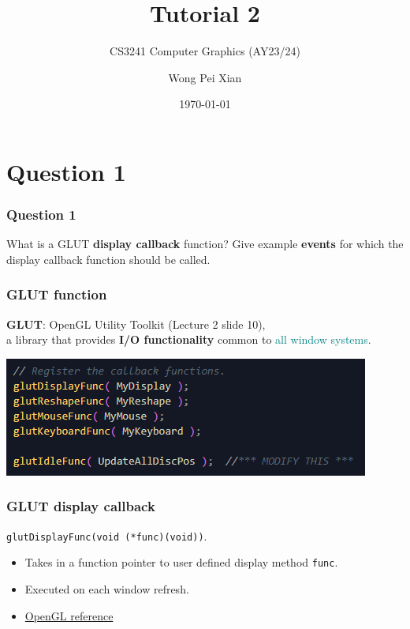 \documentclass{beamer}
\title{Tutorial 2}
\subtitle{CS3241 Computer Graphics (AY23/24)}
\date{\today}
\author{Wong Pei Xian}
\institute[]{\email{e0389023@u.nus.edu}}
\begin{document}
\frame[plain]{\titlepage}

\section{Question 1}

\begin{frame}
    \frametitle{Question 1}
    What is a GLUT \textbf{display callback} function?  
    Give example \textbf{events} for which the display callback function should be called.
\end{frame}

\begin{frame}
    \frametitle{GLUT function}

    \begin{tcolorbox}
        \textbf{GLUT}: OpenGL Utility Toolkit (Lecture 2 slide 10), \\
        
        a library that provides \textbf{I/O functionality} common to \textcolor{teal}{all window systems}.
    \end{tcolorbox}

    \begin{center}
        \includegraphics[]{q1-glut-callbacks.png}
    \end{center}

\end{frame}

\begin{frame}
    \frametitle{GLUT display callback}

    \begin{tcolorbox}
        \centering
        \texttt{glutDisplayFunc(void (*func)(void))}.
    \end{tcolorbox}

    \begin{itemize}
        \item Takes in a function pointer to user defined display method \texttt{func}.
        \item Executed on each window refresh.
        \item \href{https://www.opengl.org/resources/libraries/glut/spec3/node46.html}{OpenGL reference}
    \end{itemize}

\end{frame}
\end{document}
